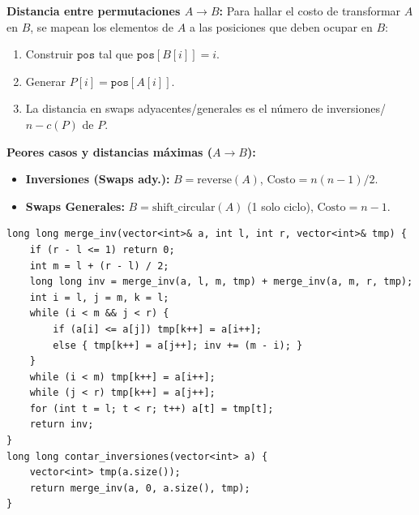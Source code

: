 \textbf{Distancia entre permutaciones $A \to B$:}
Para hallar el costo de transformar $A$ en $B$, se mapean los elementos de $A$ a las posiciones que deben ocupar en $B$:
\begin{enumerate}[noitemsep]
    \item Construir $\texttt{pos}$ tal que $\texttt{pos}[B[i]] = i$.
    \item Generar $P[i] = \texttt{pos}[A[i]]$.
    \item La distancia en swaps adyacentes/generales es el número de inversiones/$n - c(P)$ de $P$.
\end{enumerate}

\textbf{Peores casos y distancias máximas ($A \to B$):}
\begin{itemize}[noitemsep]
    \item \textbf{Inversiones (Swaps ady.):} $B = \text{reverse}(A)$,  $\text{Costo} = n(n-1)/2$.
    \item \textbf{Swaps Generales:} $B = \text{shift\_circular}(A)$ (1 solo ciclo), $\text{Costo} = n - 1$.
\end{itemize}


\begin{verbatim}
long long merge_inv(vector<int>& a, int l, int r, vector<int>& tmp) {
    if (r - l <= 1) return 0;
    int m = l + (r - l) / 2;
    long long inv = merge_inv(a, l, m, tmp) + merge_inv(a, m, r, tmp);
    int i = l, j = m, k = l;
    while (i < m && j < r) {
        if (a[i] <= a[j]) tmp[k++] = a[i++];
        else { tmp[k++] = a[j++]; inv += (m - i); }
    }
    while (i < m) tmp[k++] = a[i++];
    while (j < r) tmp[k++] = a[j++];
    for (int t = l; t < r; t++) a[t] = tmp[t];
    return inv;
}
long long contar_inversiones(vector<int> a) {
    vector<int> tmp(a.size());
    return merge_inv(a, 0, a.size(), tmp);
}
\end{verbatim}
